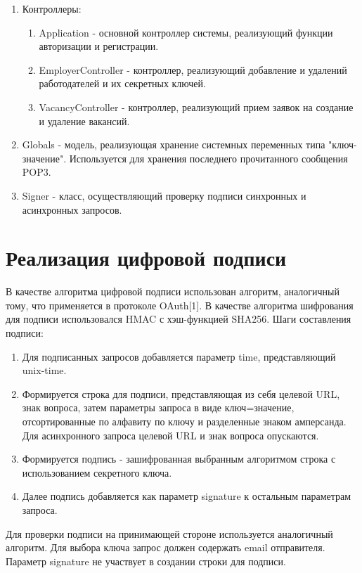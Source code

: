 \begin{enumerate}
\item Контроллеры:
\begin{enumerate}
\item Application - основной контроллер системы, реализующий функции авторизации и регистрации.
\item EmployerController - контроллер, реализующий добавление и удалений работодателей и их секретных ключей.
\item VacancyController - контроллер, реализующий прием заявок на создание и удаление вакансий.
\end{enumerate}
\item Globals - модель, реализующая хранение системных переменных типа "ключ-значение". Используется для хранения последнего прочитанного сообщения POP3.
\item Signer - класс, осуществляющий проверку подписи синхронных и асинхронных запросов.
\end{enumerate}

\section{Реализация цифровой подписи}
В качестве алгоритма цифровой подписи использован алгоритм, аналогичный тому, что применяется в протоколе OAuth[1]. В качестве алгоритма шифрования для подписи использовался HMAC с хэш-функцией SHA256. Шаги составления подписи:
\begin{enumerate}
\item Для подписанных запросов добавляется параметр time, представляющий unix-time.
\item Формируется строка для подписи, представляющая из себя целевой URL, знак вопроса, затем параметры запроса в виде ключ=значение, отсортированные по алфавиту по ключу и разделенные знаком амперсанда. Для асинхронного запроса целевой URL и знак вопроса опускаются.
\item Формируется подпись - зашифрованная выбранным алгоритмом строка с использованием секретного ключа.
\item Далее подпись добавляется как параметр signature к остальным параметрам запроса.
\end{enumerate}

Для проверки подписи на принимающей стороне используется аналогичный алгоритм. Для выбора ключа запрос должен содержать email отправителя. Параметр signature не участвует в создании строки для подписи.

